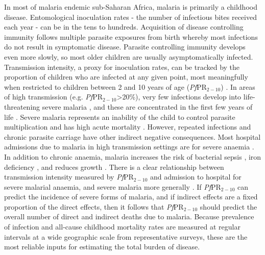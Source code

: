 \documentclass[12pt]{article}
\begin{document}
In most of malaria endemic sub-Saharan Africa, malaria is primarily a childhood disease. Entomological inoculation rates - the number of infectious bites received each year - can be in the tens to hundreds. Acquisition of disease controlling immunity follows multiple parasite exposures from birth \cite{filipe2007immunity} whereby most infections do not result in symptomatic disease. Parasite controlling immunity develops even more slowly, so most older children are usually asymptomatically infected. Transmission intensity, a proxy for inoculation rates, can be tracked by the proportion of children who are infected at any given point, most meaningfully when restricted to children between 2 and 10 years of age (\textit{Pf}PR$_{2-10}$) \cite{Metselaar:59,smith2007standardizing,smith2005entomological}. In areas of high transmission (e.g. \textit{Pf}PR$_{2-10}$>20\%), very few infections develop into life-threatening severe malaria \cite{duffy}, and these are concentrated in the first few years of life \cite{Kamau:22}. Severe malaria represents an inability of the child to control parasite multiplication and has high acute mortality \cite{white_severe}. However, repeated infections and chronic parasite carriage have other indirect negative consequences. Most hospital admissions due to malaria in high transmission settings are for severe anaemia \cite{Kamau:22}. In addition to chronic anaemia, malaria increases the risk of bacterial sepsis \cite{scott,Mackenzie:10}, iron deficiency \cite{Muriuki:21}, and reduces growth \cite{Oldenburg:18}. There is a clear relationship between transmission intensity measured by \textit{Pf}PR$_{2-10}$ and admission to hospital for severe malarial anaemia, and severe malaria more generally \cite{snowsevere,Paton2021,Kamau:22}. If \textit{Pf}PR$_{2-10}$ can predict the incidence of severe forms of malaria, and if indirect effects are a fixed proportion of the direct effects, then it follows that \textit{Pf}PR$_{2-10}$ should predict the overall number of direct and indirect deaths due to malaria. Because prevalence of infection and all-cause childhood mortality rates are measured at regular intervals at a wide geographic scale from representative surveys, these are the most reliable inputs for estimating the total burden of disease. 
\end{document}

